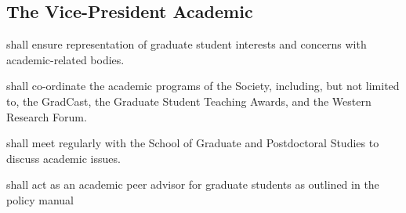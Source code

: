 \subsection {The Vice-President Academic} 
\begin{longenum}[ label*=\thesubsection.\arabic*., align=left]
	\item shall ensure representation of graduate student interests and concerns with academic-related bodies.
    \item shall co-ordinate the academic programs of the Society, including, but not limited to, the GradCast, the Graduate Student Teaching Awards, and the Western Research Forum.
    \item shall meet regularly with the School of Graduate and Postdoctoral Studies to discuss academic issues.
    \item shall act as an academic peer advisor for graduate students as outlined in the policy manual
    
\end{longenum}

